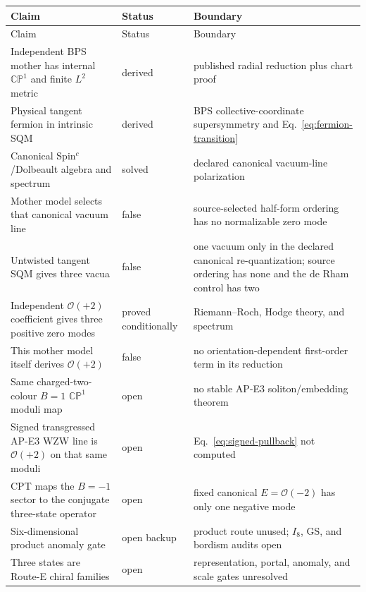 \documentclass[11pt]{article}
\theoremstyle{definition}
\theoremstyle{remark}
\newcommand{\CP}{\mathbb {CP}}
\newcommand{\cO}{\mathcal O}
\newcommand{\status}[1]{\textcolor{blue!60!black}{\textsf{#1}}}
\begin{document}
\begin{longtable}{@{}L{0.47\textwidth}L{0.18\textwidth}L{0.27\textwidth}@{}}
\toprule
Claim & Status & Boundary\\
\midrule
\endfirsthead
\toprule
Claim & Status & Boundary\\
\midrule
\endhead
Independent BPS mother has internal \(\CP^1\) and finite \(L^2\) metric &
\status{derived} & published radial reduction plus chart proof\\
Physical tangent fermion in intrinsic SQM & \status{derived} & BPS
collective-coordinate supersymmetry and Eq.~\eqref{eq:fermion-transition}\\
Canonical Spin\({}^c\)/Dolbeault algebra and spectrum & \status{solved} &
declared canonical vacuum-line polarization\\
Mother model selects that canonical vacuum line & \status{false} &
source-selected half-form ordering has no normalizable zero mode\\
Untwisted tangent SQM gives three vacua & \status{false} & one vacuum only in
the declared canonical re-quantization; source ordering has none and the de
Rham control has two\\
Independent \(\cO(+2)\) coefficient gives three positive zero modes &
\status{proved conditionally} & Riemann--Roch, Hodge theory, and spectrum\\
This mother model itself derives \(\cO(+2)\) & \status{false} & no
orientation-dependent first-order term in its reduction\\
Same charged-two-colour \(B=1\) \(\CP^1\) moduli map & \status{open} & no
stable AP-E3 soliton/embedding theorem\\
Signed transgressed AP-E3 WZW line is \(\cO(+2)\) on that same moduli &
\status{open} & Eq.~\eqref{eq:signed-pullback} not computed\\
CPT maps the \(B=-1\) sector to the conjugate three-state operator &
\status{open} & fixed canonical \(E=\cO(-2)\) has only one negative mode\\
Six-dimensional product anomaly gate & \status{open backup} & product route
unused; \(I_8\), GS, and bordism audits open\\
Three states are Route-E chiral families & \status{open} & representation,
portal, anomaly, and scale gates unresolved\\
\bottomrule
\end{longtable}
\end{document}
